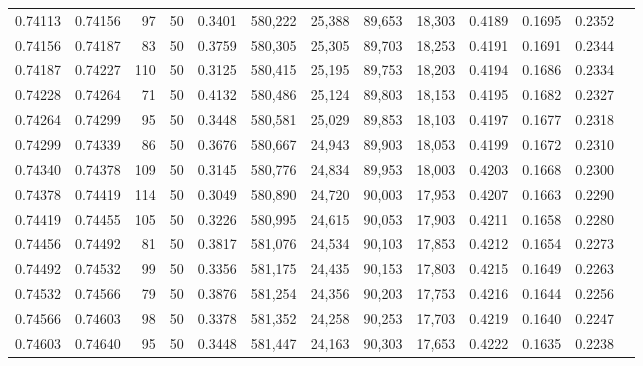 \begin{tabular}{rrrrrrrrrrrrr}
0.74113 & 0.74156 &    97 &  50 &                                     0.3401 & 580,222 &  25,388 &  89,653 &  18,303 & 0.4189 & 0.1695 & 0.2352 \\
0.74156 & 0.74187 &    83 &  50 &                                     0.3759 & 580,305 &  25,305 &  89,703 &  18,253 & 0.4191 & 0.1691 & 0.2344 \\
0.74187 & 0.74227 &   110 &  50 &                                     0.3125 & 580,415 &  25,195 &  89,753 &  18,203 & 0.4194 & 0.1686 & 0.2334 \\
0.74228 & 0.74264 &    71 &  50 &                                     0.4132 & 580,486 &  25,124 &  89,803 &  18,153 & 0.4195 & 0.1682 & 0.2327 \\
0.74264 & 0.74299 &    95 &  50 &                                     0.3448 & 580,581 &  25,029 &  89,853 &  18,103 & 0.4197 & 0.1677 & 0.2318 \\
0.74299 & 0.74339 &    86 &  50 &                                     0.3676 & 580,667 &  24,943 &  89,903 &  18,053 & 0.4199 & 0.1672 & 0.2310 \\
0.74340 & 0.74378 &   109 &  50 &                                     0.3145 & 580,776 &  24,834 &  89,953 &  18,003 & 0.4203 & 0.1668 & 0.2300 \\
0.74378 & 0.74419 &   114 &  50 &                                     0.3049 & 580,890 &  24,720 &  90,003 &  17,953 & 0.4207 & 0.1663 & 0.2290 \\
0.74419 & 0.74455 &   105 &  50 &                                     0.3226 & 580,995 &  24,615 &  90,053 &  17,903 & 0.4211 & 0.1658 & 0.2280 \\
0.74456 & 0.74492 &    81 &  50 &                                     0.3817 & 581,076 &  24,534 &  90,103 &  17,853 & 0.4212 & 0.1654 & 0.2273 \\
0.74492 & 0.74532 &    99 &  50 &                                     0.3356 & 581,175 &  24,435 &  90,153 &  17,803 & 0.4215 & 0.1649 & 0.2263 \\
0.74532 & 0.74566 &    79 &  50 &                                     0.3876 & 581,254 &  24,356 &  90,203 &  17,753 & 0.4216 & 0.1644 & 0.2256 \\
0.74566 & 0.74603 &    98 &  50 &                                     0.3378 & 581,352 &  24,258 &  90,253 &  17,703 & 0.4219 & 0.1640 & 0.2247 \\
0.74603 & 0.74640 &    95 &  50 &                                     0.3448 & 581,447 &  24,163 &  90,303 &  17,653 & 0.4222 & 0.1635 & 0.2238 \\

\end{tabular}
